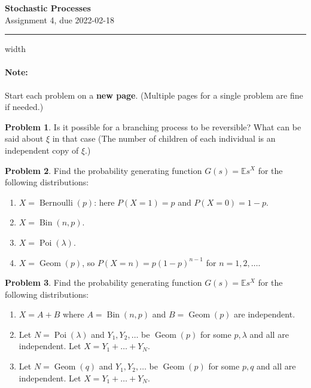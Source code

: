 \documentclass{article}
\newcommand{\E}{\mathbb E}
\DeclareMathOperator{\Poi}{Poi}
\DeclareMathOperator{\Bin}{Bin}
\DeclareMathOperator{\Geom}{Geom}
\DeclareMathOperator{\Bernoulli}{Bernoulli}
\theoremstyle{definition}
\newtheorem{problem}{Problem}
\begin{document}
\thispagestyle{crfooter}

\begin{center}
  {\LARGE \textbf{Stochastic Processes}} \\
  {\Large Assignment 4, due 2022-02-18}
\end{center}

\hrule width \textwidth \bigskip

\paragraph{Note:} Start each problem on a \textbf{new page}. (Multiple pages for a single problem are fine if needed.)


\begin{problem}
  Is it possible for a branching process to be reversible?
  What can be said about $\xi$ in that case (The number of children of each individual is an independent copy of $\xi$.)
\end{problem}


\begin{problem}
  Find the probability generating function $G(s) = \E s^X$ for the following distributions:
  \begin{enumerate}
  \item $X=\Bernoulli(p)$: here $P(X=1)=p$ and $P(X=0)=1-p$.
  \item $X=\Bin(n,p)$.
  \item $X=\Poi(\lambda)$.
  \item $X=\Geom(p)$, so $P(X=n) = p(1-p)^{n-1}$ for $n=1,2,\dots$.
  \end{enumerate}
\end{problem}


\begin{problem}
  Find the probability generating function $G(s) = \E s^X$ for the following distributions:
  \begin{enumerate}
  \item $X=A+B$ where $A=\Bin(n,p)$ and $B=\Geom(p)$ are independent.
  \item Let $N=\Poi(\lambda)$ and $Y_1,Y_2,\dots$ be $\Geom(p)$ for some $p,\lambda$ and all are independent.
    Let $X = Y_1+\dots+Y_N$.
  \item Let $N=\Geom(q)$ and $Y_1,Y_2,\dots$ be $\Geom(p)$ for some $p,q$ and all are independent.
    Let $X = Y_1+\dots+Y_N$.
  \end{enumerate}
\end{problem}
\end{document}
